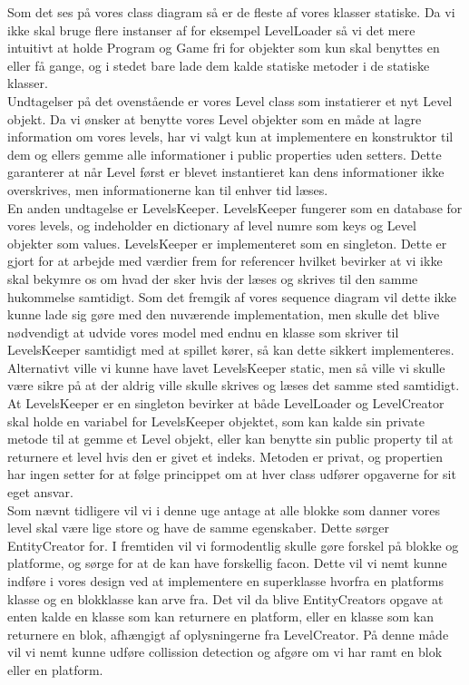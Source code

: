 Som det ses på vores class diagram så er de fleste af vores klasser statiske. Da vi ikke skal bruge flere instanser af for eksempel LevelLoader så vi det mere intuitivt at holde Program og Game fri for objekter som kun skal benyttes en eller få gange, og i stedet bare lade dem kalde statiske metoder i de statiske klasser.\\
Undtagelser på det ovenstående er vores Level class som instatierer et nyt Level objekt. Da vi ønsker at benytte vores Level objekter som en måde at lagre information om vores levels, har vi valgt kun at implementere en konstruktor til dem og ellers gemme alle informationer i public properties uden setters. Dette garanterer at når Level først er blevet instantieret kan dens informationer ikke overskrives, men informationerne kan til enhver tid læses.\\
En anden undtagelse er LevelsKeeper. LevelsKeeper fungerer som en database for vores levels, og indeholder en dictionary af level numre som keys og Level objekter som values. LevelsKeeper er implementeret som en singleton. Dette er gjort for at arbejde med værdier frem for referencer hvilket bevirker at vi ikke skal bekymre os om hvad der sker hvis der læses og skrives til den samme hukommelse samtidigt. Som det fremgik af vores sequence diagram vil dette ikke kunne lade sig gøre med den nuværende implementation, men skulle det blive nødvendigt at udvide vores model med endnu en klasse som skriver til LevelsKeeper samtidigt med at spillet kører, så kan dette sikkert implementeres. Alternativt ville vi kunne have lavet LevelsKeeper static, men så ville vi skulle være sikre på at der aldrig ville skulle skrives og læses det samme sted samtidigt.\\
At LevelsKeeper er en singleton bevirker at både LevelLoader og LevelCreator skal holde en variabel for LevelsKeeper objektet, som kan kalde sin private metode til at gemme et Level objekt, eller kan benytte sin public property til at returnere et level hvis den er givet et indeks. Metoden er privat, og propertien har ingen setter for at følge princippet om at hver class udfører opgaverne for sit eget ansvar.\\

Som nævnt tidligere vil vi i denne uge antage at alle blokke som danner vores level skal være lige store og have de samme egenskaber. Dette sørger EntityCreator for. I fremtiden vil vi formodentlig skulle gøre forskel på blokke og platforme, og sørge for at de kan have forskellig facon. Dette vil vi nemt kunne indføre i vores design ved at implementere en superklasse hvorfra en platforms klasse og en blokklasse kan arve fra. Det vil da blive EntityCreators opgave at enten kalde en klasse som kan returnere en platform, eller en klasse som kan returnere en blok, afhængigt af oplysningerne fra LevelCreator. På denne måde vil vi nemt kunne udføre collission detection og afgøre om vi har ramt en blok eller en platform.
